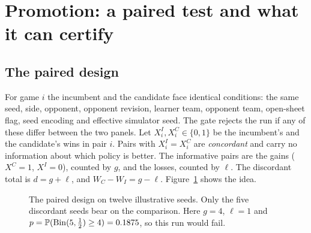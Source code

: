 \section{Promotion: a paired test and what it can certify}
\label{sec:promotion}

\historyscope

\subsection{The paired design}
For game $i$ the incumbent and the candidate face identical conditions: the
same seed, side, opponent, opponent revision, learner team, opponent team,
open-sheet flag, seed encoding and effective simulator seed. The gate rejects
the run if any of these differ between the two panels. Let
$X_i^I,X_i^C\in\{0,1\}$ be the incumbent's and the candidate's wins in pair
$i$. Pairs with $X_i^I=X_i^C$ are \emph{concordant} and carry no information
about which policy is better. The informative pairs are the gains ($X^C=1$,
$X^I=0$), counted by $g$, and the losses, counted by $\ell$. The discordant
total is $d=g+\ell$, and $W_C-W_I=g-\ell$. Figure~\ref{fig:paired} shows the
idea.

\begin{figure}[htbp]
\centering
{}
\caption{The paired design on twelve illustrative seeds. Only the five
discordant seeds bear on the comparison. Here $g=4$, $\ell=1$ and
$p=\mathbb{P}(\operatorname{Bin}(5,\tfrac12)\ge4)=0.1875$, so this run would fail.}
\label{fig:paired}
\end{figure}

